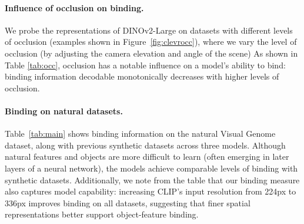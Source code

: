 \documentclass{article}
\theoremstyle{plain}
\theoremstyle{definition}
\theoremstyle{remark}
\begin{document}
\paragraph{Influence of occlusion on binding.} 

We probe the representations of DINOv2-Large on datasets with different levels of occlusion (examples shown in Figure~\ref{fig:clevrocc}), 
where we vary the level of occlusion (by adjusting the camera elevation and angle of the scene) As shown in Table \ref{tab:occ}, occlusion has a notable influence on a model's ability to bind: binding information decodable monotonically decreases with higher levels of occlusion. 


\begin{table}[H]
\centering
\caption{\textbf{Effect of occlusion on binding for DINOv2-Large}, using CLEVR dataset with 4 colors and 3 shapes. Camera elevation serves as a proxy for \textbf{occlusion level} (higher means less occlusion). $\Delta \beta(Z)$ is measured relative to the most occluded setting (0.6).}
\label{tab:occ}
\end{table}

\paragraph{Binding on natural datasets.} Table~\ref{tab:main} shows binding information on the natural Visual Genome dataset, along with previous synthetic datasets across three models. Although natural features and objects are more difficult to learn (often emerging in later layers of a neural network), the models achieve comparable levels of binding with synthetic datasets. Additionally, we note from the table that our binding measure also captures model capability: increasing CLIP's input resolution from 224px to 336px improves binding on all datasets, suggesting that finer spatial representations better support object-feature binding.
\end{document}
